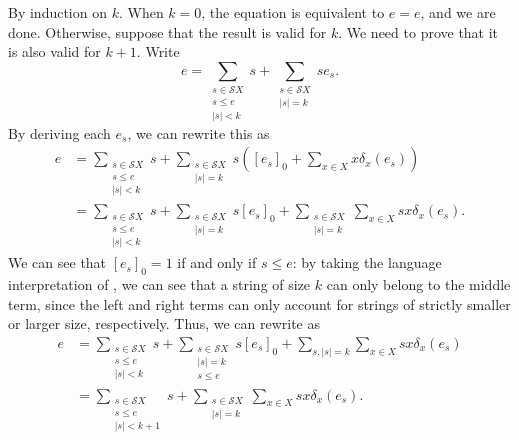 \documentclass[11pt,a4paper]{amsart}
\theoremstyle{definition}
\begin{document}
\begin{proofEnd} %
  By induction on $k$.  When $k = 0$, the equation is equivalent to $e = e$, and
  we are done.  Otherwise, suppose that the result is valid for $k$.  We need to
  prove that it is also valid for $k+1$.  Write
  \[ e =  \sum _{\substack{s  \in  \mathcal{S}X \\ s  \leq  e \\ |s| < k}} s + %
     \sum _{\substack{ s  \in  \mathcal{S}X \\ |s| = k}} se_s. \] By deriving each $e_s$, we can
  rewrite this as
  \begin{align}
    e
    & =  \sum _{\substack{s  \in  \mathcal{S}X \\ s \leq  e \\ |s| < k}} s + %
     \sum _{\substack{s  \in  \mathcal{S}X \\ |s| = k}}s\left([e_s]_0 +  \sum _{x  \in  X} x \delta _x(e_s)\right) \nonumber \\
    & =  \sum _{\substack{s  \in  \mathcal{S}X \\ s  \leq  e \\ |s| < k}} s + %
     \sum _{\substack{s  \in  \mathcal{S}X \\ |s| = k}} s[e_s]_0 + %
     \sum _{\substack{s  \in  \mathcal{S}X \\ |s|=k}} \sum _{x  \in  X}sx \delta _x(e_s).
    \label{eq:expansion-1}
  \end{align}
  We can see that $[e_s]_0 = 1$ if and only if $s  \leq  e$: by taking the language
  interpretation of , we can see that a string of size
  $k$ can only belong to the middle term, since the left and right terms can
  only account for strings of strictly smaller or larger size, respectively.
  Thus, we can rewrite  as
  \begin{align}
    e
    & =  \sum _{\substack{s  \in  \mathcal{S}X \\ s  \leq  e \\ |s| < k}} s + %
     \sum _{\substack{s  \in  \mathcal{S}X \\ |s| = k \\ s  \leq  e}} s[e_s]_0 + %
     \sum _{s, |s|=k} \sum _{x  \in  X}sx \delta _x(e_s) \nonumber \\
    & =  \sum _{\substack{s  \in  \mathcal{S}X \\ s  \leq  e \\ |s| < k+1}} s + %
     \sum _{\substack{s  \in  \mathcal{S}X \\ |s|=k}} \sum _{x  \in  X}sx \delta _x(e_s).
    \label{eq:expansion-2}
  \end{align}


\end{proofEnd}
\end{document}
